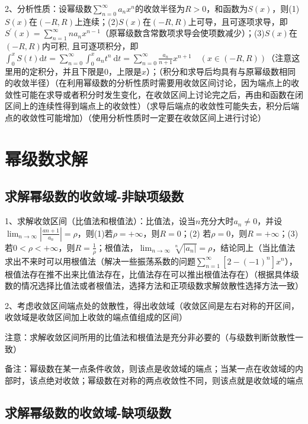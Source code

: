 2、分析性质：设幂级数$\sum_{n=0}^{\infty} a_{n} x^{n}$的收敛半径为$R>0$，和函数为$S(x)$，则(1)$S(x)$在$(-R, R)$上连续；(2)$S(x)$在$(-R, R)$上可导，且可逐项求导，即$S^{\prime}(x)=\sum_{n=1}^{\infty} n a_{n} x^{n-1}$（原幂级数含常数项求导会使项数减少）；(3)$S(x)$在$(-R, R)$内可积, 且可逐项积分，即$\int_{0}^{x} S(t) \mathrm{d} t=\sum_{n=0}^{\infty} \int_{0}^{x} a_{n} t^{n} \mathrm{~d} t=\sum_{n=0}^{\infty} \frac{a_{n}}{n+1} x^{n+1} \quad(x \in(-R, R))$（注意这里用的定积分，并且下限是$0$，上限是$x$）；（积分和求导后均具有与原幂级数相同的收敛半径）（在利用幂级数的分析性质时需要用收敛区间讨论，因为端点上的收敛性可能在求导或者积分时发生变化，在收敛区间上讨论完之后，再由和函数在闭区间上的连续性得到端点上的收敛性）（求导后端点的收敛性可能失去，积分后端点的收敛性可能增加）（使用分析性质时一定要在收敛区间上进行讨论）

\section{幂级数求解}



\subsection{求解幂级数的收敛域-非缺项级数}

1、求解收敛区间（比值法和根值法）：比值法，设当$n$充分大时$a_{n} \neq 0$，并设$\lim_{n \rightarrow \infty}\left|\frac{a{n+1}}{a_{n}}\right|=\rho$，则(1)若$\rho=+\infty$，则$R=0$；(2) 若$\rho=0$，则$R=+\infty$；(3) 若$0<\rho<+\infty$，则$R=\frac{1}{\rho}$；根值法，$\lim_{n \rightarrow \infty} \sqrt[n]{\mid a_{n} |}=\rho$，结论同上（当比值法求出不来时可以用根值法（解决一些振荡系数的问题$\sum_{n=1}^{\infty}\left[2-(-1)^{n}\right] x^{n}$），根值法存在推不出来比值法存在，比值法存在可以推出根值法存在）（根据具体级数的情况选择比值法或者根值法，选择方法和正项级数求解敛散性选择方法一致）

2、考虑收敛区间端点处的敛散性，得出收敛域（收敛区间是左右对称的开区间，收敛域是收敛区间加上收敛的端点值组成的区间）

注意：求解收敛区间所用的比值法和根值法是充分非必要的（与级数判断敛散性一致）

备注：幂级数在某一点条件收敛，则该点是收敛域的端点；当某一点在收敛域的内部时，该点绝对收敛；幂级数在对称的两点收敛性不同，则该点就是收敛域的端点



\subsection{求解幂级数的收敛域-缺项级数}

